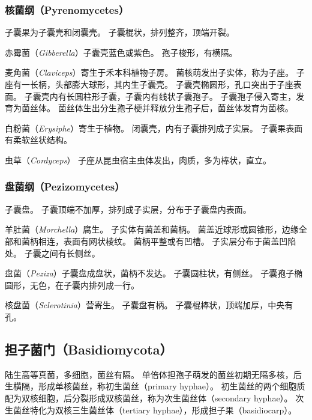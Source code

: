 \documentclass[11pt]{article}
\begin{document}
\subsubsection{核菌纲（Pyrenomycetes）}
子囊果为子囊壳和闭囊壳。
子囊棍状，排列整齐，顶端开裂。

\newline

赤霉菌（\textit{Gibberella}）子囊壳蓝色或紫色。
孢子梭形，有横隔。

\newline

麦角菌（\textit{Claviceps}）寄生于禾本科植物子房。
菌核萌发出子实体，称为子座。
子座有一长柄，头部膨大球形，其内生子囊壳。
子囊壳椭圆形，孔口突出于子座表面。
子囊壳内有长圆柱形子囊，子囊内有线状子囊孢子。
子囊孢子侵入寄主，发育为菌丝体。
菌丝体生出分生孢子梗并释放分生孢子后，菌丝体发育为菌核。

\newline

白粉菌（\textit{Erysiphe}）寄生于植物。
闭囊壳，内有子囊排列成子实层。
子囊果表面有柔软丝状结构。

\newline

虫草（\textit{Cordyceps}）
子座从昆虫宿主虫体发出，肉质，多为棒状，直立。

\subsubsection{盘菌纲（Pezizomycetes）}
子囊盘。
子囊顶端不加厚，排列成子实层，分布于子囊盘内表面。

\newline

羊肚菌（\textit{Morchella}）腐生。
子实体有菌盖和菌柄。
菌盖近球形或圆锥形，边缘全部和菌柄相连，表面有网状棱纹。
菌柄平整或有凹槽。
子实层分布于菌盖凹陷处。
子囊之间有长侧丝。

\newline

盘菌（\textit{Peziza}）子囊盘成盘状，菌柄不发达。
子囊圆柱状，有侧丝。
子囊孢子椭圆形，无色，在子囊内排列成一行。

\newline

核盘菌（\textit{Sclerotinia}）营寄生。
子囊盘有柄。
子囊棍棒状，顶端加厚，中央有孔。

\subsection{担子菌门（Basidiomycota）}
陆生高等真菌，多细胞，菌丝有隔。
单倍体担孢子萌发的菌丝初期无隔多核，后生横隔，形成单核菌丝，称初生菌丝（primary hyphae）。
初生菌丝的两个细胞质配为双核细胞，后分裂形成双核菌丝，称为次生菌丝体（secondary hyphae）。
次生菌丝特化为双核三生菌丝体（tertiary hyphae），形成担子果（basidiocarp）。
\end{document}
